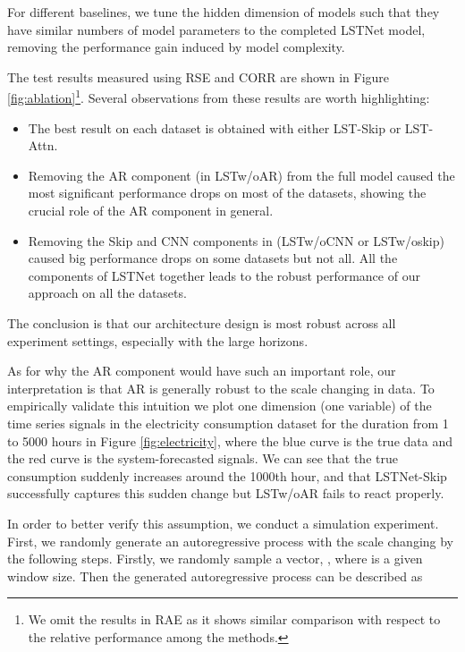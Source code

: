 \documentclass[sigconf]{acmart}
\begin{document}
For different baselines, we tune the hidden dimension of models such that they have similar numbers of model parameters to the completed LSTNet model, removing the performance gain induced by model complexity.

The test results measured using RSE and CORR are shown in Figure \ref{fig:ablation}\footnote{We omit the results in RAE as it shows similar comparison with respect to the relative performance among the methods.}. Several observations from these results are worth highlighting:
\begin{itemize}
\item The best result on each dataset is obtained with either LST-Skip or LST-Attn.
\item Removing the AR component (in LSTw/oAR) from the full model caused the most significant performance drops on most of the datasets, showing the crucial role of the AR component in general.
\item Removing the Skip and CNN components in (LSTw/oCNN or LSTw/oskip) caused big performance drops on some datasets but not all. All the components of LSTNet together leads to the robust performance of our approach on all the datasets.
\end{itemize}





The conclusion is that our architecture design is most robust across all experiment settings, especially with the large horizons.



As for why the AR component would have such an important role, our interpretation is that AR is generally robust to the scale changing in data. To empirically validate this intuition we plot one dimension (one variable) of the time series signals in the electricity consumption dataset for the duration from 1 to 5000 hours in Figure \ref{fig:electricity}, where the blue curve is the true data and the red curve is the system-forecasted signals. We can see that the true consumption suddenly increases around the 1000th hour, and that LSTNet-Skip successfully captures this sudden change but LSTw/oAR fails to react properly. 

In order to better verify this assumption, we conduct a simulation experiment. First, we randomly generate an autoregressive process with the scale changing by the following steps. Firstly, we randomly sample a vector, , where  is a given window size. Then the generated autoregressive process  can be described as 
\end{document}
